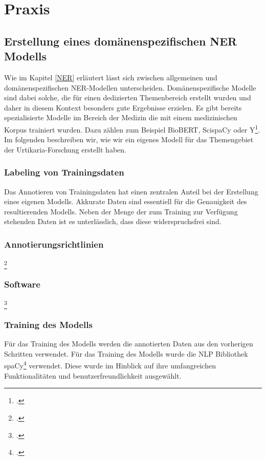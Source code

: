 \newpage
\section{Praxis} \label{latexDetails}
\subsection{Erstellung eines domänenspezifischen NER Modells}
Wie im Kapitel \ref{NER} erläutert lässt sich zwischen allgemeinen und domänenspezifischen \ac{NER}-Modellen unterscheiden. Domänenspezifische Modelle sind dabei solche, die für einen dedizierten Themenbereich erstellt wurden und daher in diesem Kontext besonders gute Ergebnisse erzielen.
Es gibt bereits spezialisierte Modelle im Bereich der Medizin die mit einem medizinischen Korpus trainiert wurden. Dazu zählen zum Beispiel BioBERT, ScispaCy oder Y\footcite[S.12]{li2020}. Im folgenden beschreiben wir, wie wir ein eigenes Modell für das Themengebiet der Urtikaria-Forschung erstellt haben.
\subsubsection{Labeling von Trainingsdaten}
Das Annotieren von Trainingsdaten hat einen zentralen Anteil bei der Erstellung eines eigenen Modells. Akkurate Daten sind essentiell für die Genauigkeit des resultierenden Modells. Neben der Menge der zum Training zur Verfügung stehenden Daten ist es unterlässlich, dass diese widerspruchsfrei sind.

\subsubsection{Annotierungsrichtlinien}
\footcite[vgl.][]{neves2014}

\subsubsection{Software}
\footcite[vgl.][]{neves2014a}

\subsubsection{Training des Modells}
Für das Training des Modells werden die annotierten Daten aus den vorherigen Schritten verwendet.
Für das Training des Modells wurde die \acl*{NLP} Bibliothek spaCy\footcite[]{spacy2} verwendet. Diese wurde im Hinblick auf ihre umfangreichen Funktionalitäten und benutzerfreundlichkeit ausgewählt.

